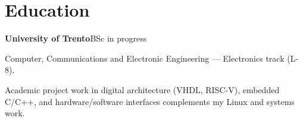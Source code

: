 \section{Education}
\textbf{University of Trento}\hfill{\small\color{muted}BSc in progress}\par
Computer, Communications and Electronic Engineering --- Electronics track (L-8).\par
{\small Academic project work in digital architecture (VHDL, RISC-V), embedded C/C++, and
hardware/software interfaces complements my Linux and systems work.}\par
